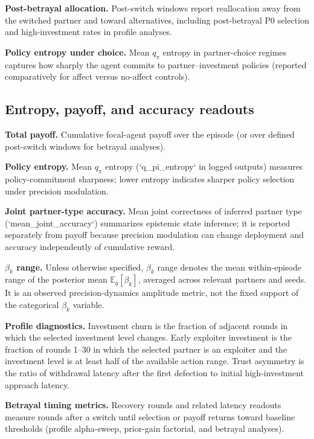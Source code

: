 \textbf{Post-betrayal allocation.} Post-switch windows report reallocation away from the switched partner and toward alternatives, including post-betrayal P0 selection and high-investment rates in profile analyses.

\textbf{Policy entropy under choice.} Mean $q_\pi$ entropy in partner-choice regimes captures how sharply the agent commits to partner--investment policies (reported comparatively for affect versus no-affect controls).

\subsection{Entropy, payoff, and accuracy readouts}

\textbf{Total payoff.} Cumulative focal-agent payoff over the episode (or over defined post-switch windows for betrayal analyses).

\textbf{Policy entropy.} Mean $q_\pi$ entropy (`q\_pi\_entropy` in logged outputs) measures policy-commitment sharpness; lower entropy indicates sharper policy selection under precision modulation.

\textbf{Joint partner-type accuracy.} Mean joint correctness of inferred partner type (`mean\_joint\_accuracy`) summarizes epistemic state inference; it is reported separately from payoff because precision modulation can change deployment and accuracy independently of cumulative reward.

\textbf{$\beta_k$ range.} Unless otherwise specified, $\beta_k$ range denotes the mean within-episode range of the posterior mean $\mathbb{E}_{q}[\beta_k]$, averaged across relevant partners and seeds. It is an observed precision-dynamics amplitude metric, not the fixed support of the categorical $\beta_k$ variable.

\textbf{Profile diagnostics.} Investment churn is the fraction of adjacent rounds in which the selected investment level changes. Early exploiter investment is the fraction of rounds 1--30 in which the selected partner is an exploiter and the investment level is at least half of the available action range. Trust asymmetry is the ratio of withdrawal latency after the first defection to initial high-investment approach latency.

\textbf{Betrayal timing metrics.} Recovery rounds and related latency readouts measure rounds after a switch until selection or payoff returns toward baseline thresholds (profile alpha-sweep, prior-gain factorial, and betrayal analyses).

